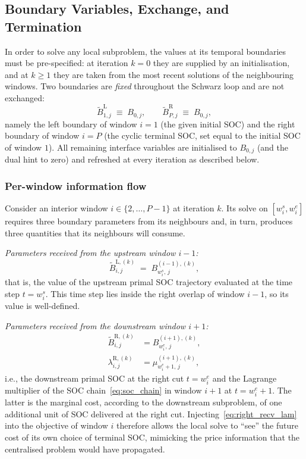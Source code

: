 \subsection{Boundary Variables, Exchange, and Termination}
\label{sec:otd_bc}

In order to solve any local subproblem, the values at its temporal
boundaries must be pre-specified: at iteration $k\!=\!0$ they are supplied
by an initialisation, and at $k\!\ge\!1$ they are taken from the most
recent solutions of the neighbouring windows. Two boundaries are
\emph{fixed} throughout the Schwarz loop and are not exchanged:
\begin{equation}
\label{eq:fixed_bc}
\widetilde{B}^{\mathrm{L}}_{1,j}\;\equiv\;B_{0,j},
\qquad
\widetilde{B}^{\mathrm{R}}_{P,j}\;\equiv\;B_{0,j},
\end{equation}
namely the left boundary of window $i\!=\!1$ (the given initial SOC) and
the right boundary of window $i\!=\!P$ (the cyclic terminal SOC, set equal
to the initial SOC of window $1$). All remaining interface variables are
initialised to $B_{0,j}$ (and the dual hint to zero) and refreshed at
every iteration as described below.

\subsubsection*{Per-window information flow}
Consider an interior window $i\!\in\!\{2,\dots,P\!-\!1\}$ at iteration
$k$. Its solve on $[w^{s}_{i},w^{e}_{i}]$ requires three boundary
parameters from its neighbours and, in turn, produces three quantities
that its neighbours will consume.

\emph{Parameters received from the upstream window $i\!-\!1$:}
\begin{equation}
\label{eq:left_recv}
\widetilde{B}^{\mathrm{L},(k)}_{i,j}
\;=\; B^{(i-1),(k)}_{w^{s}_{i},\,j},
\end{equation}
that is, the value of the upstream primal SOC trajectory evaluated at the
time step $t\!=\!w^{s}_{i}$. This time step lies inside the right overlap
of window $i\!-\!1$, so its value is well-defined.

\emph{Parameters received from the downstream window $i\!+\!1$:}
\begin{align}
\widetilde{B}^{\mathrm{R},(k)}_{i,j}
&= B^{(i+1),(k)}_{w^{e}_{i},\,j},
\label{eq:right_recv_B}\\
\lambda^{\mathrm{R},(k)}_{i,j}
&= \mu^{(i+1),(k)}_{w^{e}_{i}+1,\,j},
\label{eq:right_recv_lam}
\end{align}
i.e., the downstream primal SOC at the right cut $t\!=\!w^{e}_{i}$ and the
Lagrange multiplier of the SOC chain~\eqref{eq:soc_chain} in window
$i\!+\!1$ at $t\!=\!w^{e}_{i}\!+\!1$. The latter is the marginal cost,
according to the downstream subproblem, of one additional unit of SOC
delivered at the right cut. Injecting~\eqref{eq:right_recv_lam} into the
objective of window $i$ therefore allows the local solve to ``see'' the
future cost of its own choice of terminal SOC, mimicking the price
information that the centralised problem would have propagated.

